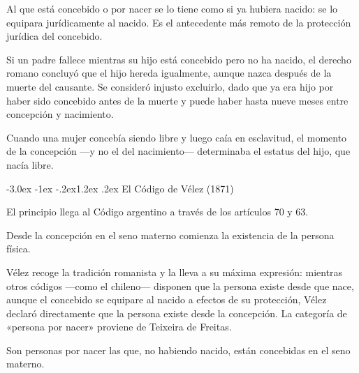 \documentclass[12pt,oneside]{book}
\makeatletter
\renewcommand\section{\@startsection{section}{1}{\z@}%
  {-3.0ex \@plus -1ex \@minus -.2ex}{1.2ex \@plus .2ex}%
  {\normalfont\large\bfseries\color{acento}}}
\makeatother
\begin{document}
\begin{definicion}
Al que está concebido o por nacer se lo tiene como si ya hubiera nacido: se lo equipara jurídicamente al nacido. Es el antecedente más remoto de la protección jurídica del concebido.
\end{definicion}

\begin{ejemplo}
Si un padre fallece mientras su hijo está concebido pero no ha nacido, el derecho romano concluyó que el hijo hereda igualmente, aunque nazca después de la muerte del causante. Se consideró injusto excluirlo, dado que ya era hijo por haber sido concebido antes de la muerte y puede haber hasta nueve meses entre concepción y nacimiento.
\end{ejemplo}

\begin{ejemplo}
Cuando una mujer concebía siendo libre y luego caía en esclavitud, el momento de la concepción ---y no el del nacimiento--- determinaba el estatus del hijo, que nacía libre.
\end{ejemplo}

\section{El Código de Vélez (1871)}

El principio llega al Código argentino a través de los artículos 70 y 63.

\begin{nota}
Desde la concepción en el seno materno comienza la existencia de la persona física.
\end{nota}

Vélez recoge la tradición romanista y la lleva a su máxima expresión: mientras otros códigos ---como el chileno--- disponen que la persona existe desde que nace, aunque el concebido se equipare al nacido a efectos de su protección, Vélez declaró directamente que la persona existe desde la concepción. La categoría de «persona por nacer» proviene de Teixeira de Freitas.

\begin{nota}
Son personas por nacer las que, no habiendo nacido, están concebidas en el seno materno.
\end{nota}
\end{document}
